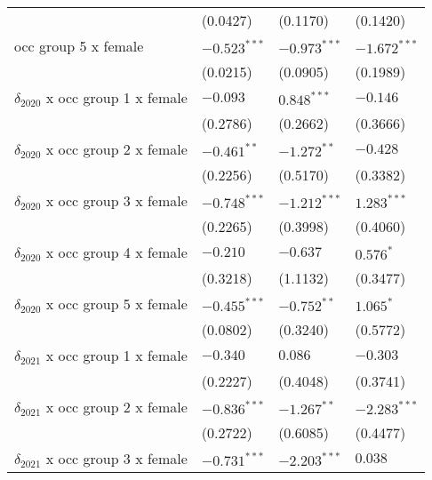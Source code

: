 \begin{tabular}{llll}
                                       &           (0.0427) &           (0.1170) &           (0.1420) \\
occ group 5 x female                   &     $-0.523^{***}$ &     $-0.973^{***}$ &     $-1.672^{***}$ \\
                                       &           (0.0215) &           (0.0905) &           (0.1989) \\
$\delta_{2020}$ x occ group 1 x female &           $-0.093$ &      $0.848^{***}$ &           $-0.146$ \\
                                       &           (0.2786) &           (0.2662) &           (0.3666) \\
$\delta_{2020}$ x occ group 2 x female &      $-0.461^{**}$ &      $-1.272^{**}$ &           $-0.428$ \\
                                       &           (0.2256) &           (0.5170) &           (0.3382) \\
$\delta_{2020}$ x occ group 3 x female &     $-0.748^{***}$ &     $-1.212^{***}$ &      $1.283^{***}$ \\
                                       &           (0.2265) &           (0.3998) &           (0.4060) \\
$\delta_{2020}$ x occ group 4 x female &           $-0.210$ &           $-0.637$ &          $0.576^*$ \\
                                       &           (0.3218) &           (1.1132) &           (0.3477) \\
$\delta_{2020}$ x occ group 5 x female &     $-0.455^{***}$ &      $-0.752^{**}$ &          $1.065^*$ \\
                                       &           (0.0802) &           (0.3240) &           (0.5772) \\
$\delta_{2021}$ x occ group 1 x female &           $-0.340$ &            $0.086$ &           $-0.303$ \\
                                       &           (0.2227) &           (0.4048) &           (0.3741) \\
$\delta_{2021}$ x occ group 2 x female &     $-0.836^{***}$ &      $-1.267^{**}$ &     $-2.283^{***}$ \\
                                       &           (0.2722) &           (0.6085) &           (0.4477) \\
$\delta_{2021}$ x occ group 3 x female &     $-0.731^{***}$ &     $-2.203^{***}$ &            $0.038$ \\

\end{tabular}
